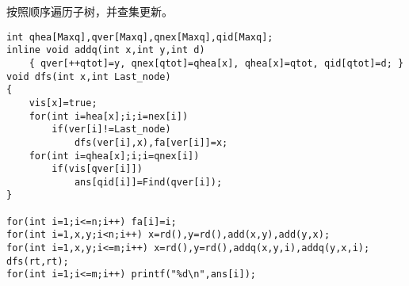 按照顺序遍历子树，并查集更新。

\begin{verbatim}
int qhea[Maxq],qver[Maxq],qnex[Maxq],qid[Maxq];
inline void addq(int x,int y,int d)
    { qver[++qtot]=y, qnex[qtot]=qhea[x], qhea[x]=qtot, qid[qtot]=d; }
void dfs(int x,int Last_node)
{
    vis[x]=true;
    for(int i=hea[x];i;i=nex[i])
        if(ver[i]!=Last_node)
            dfs(ver[i],x),fa[ver[i]]=x;
    for(int i=qhea[x];i;i=qnex[i])
        if(vis[qver[i]])
            ans[qid[i]]=Find(qver[i]);
}

for(int i=1;i<=n;i++) fa[i]=i;
for(int i=1,x,y;i<n;i++) x=rd(),y=rd(),add(x,y),add(y,x);
for(int i=1,x,y;i<=m;i++) x=rd(),y=rd(),addq(x,y,i),addq(y,x,i);
dfs(rt,rt);
for(int i=1;i<=m;i++) printf("%d\n",ans[i]);
\end{verbatim}